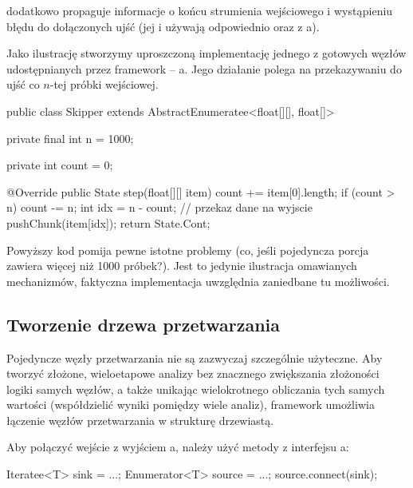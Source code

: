  dodatkowo propaguje informacje o końcu strumienia wejściowego i
wystąpieniu błędu do dołączonych ujść (jej  i  używają odpowiednio
 oraz  z a).

Jako ilustrację stworzymy uproszczoną implementację jednego z gotowych węzłów udostępnianych przez
framework -- a. Jego działanie polega na przekazywaniu do ujść co $n$-tej próbki
wejściowej.

\begin{java}
public class Skipper extends AbstractEnumeratee<float[][], float[]> {

    private final int n = 1000;

    private int count = 0;

    @Override
    public State step(float[][] item) {
        count += item[0].length;
        if (count > n) {
            count -= n;
            int idx = n - count;
            // przekaz dane na wyjscie
            pushChunk(item[idx]);
        }
        return State.Cont;
    }
}
\end{java}

\begin{Note}
Powyższy kod pomija pewne istotne problemy (co, jeśli pojedyncza porcja zawiera więcej niż 1000
próbek?). Jest to jedynie ilustracja omawianych mechanizmów, faktyczna implementacja uwzględnia
zaniedbane tu możliwości.
\end{Note}


\subsection{Tworzenie drzewa przetwarzania}

Pojedyncze węzły przetwarzania nie są zazwyczaj szczególnie użyteczne. Aby tworzyć złożone,
wieloetapowe analizy bez znacznego zwiększania złożoności logiki samych węzłów, a także unikając
wielokrotnego obliczania tych samych wartości (współdzielić wyniki pomiędzy wiele analiz), framework
umożliwia łączenie węzłów przetwarzania w strukturę drzewiastą.

Aby połączyć wejście  z wyjściem a, należy użyć metody
 z interfejsu a:

\begin{java}
Iteratee<T> sink = ...;
Enumerator<T> source = ...;
source.connect(sink);
\end{java}

